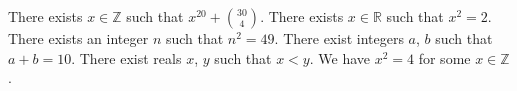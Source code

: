 There exists $x \in \mathbb{Z}$ such that $x^{20} + \binom{30}{4}$.
There exists $x \in \mathbb{R}$ such that $x^{2} = 2$.
There exists an integer $n$ such that $n^{2} = 49$.
There exist integers $a$, $b$ such that $a + b = 10$.
There exist reals $x$, $y$ such that $x < y$.
We have $x^{2} = 4$ for some $x \in \mathbb{Z}$.